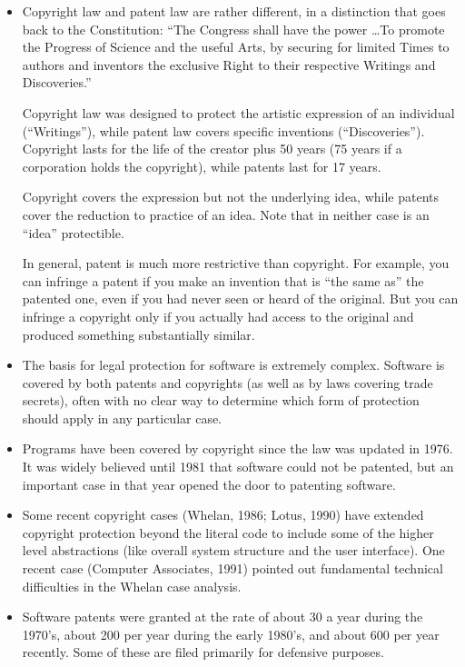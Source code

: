 \begin{itemize}

\item
Copyright law and patent law are rather different, in a distinction that goes
back to the Constitution: ``The Congress shall have the power \ldots To
promote the Progress of Science and the useful Arts, by securing for limited
Times to authors and inventors the exclusive Right to their respective
Writings and Discoveries.''

Copyright law was designed to protect the artistic expression of an
individual (``Writings''), while patent law covers specific inventions
(``Discoveries'').  Copyright lasts for the life of the creator plus
50 years (75 years if a corporation holds the copyright), while
patents last for 17 years.

Copyright covers the expression but not the underlying idea, while
patents cover the reduction to practice of an idea.  Note that in
neither case is an ``idea'' protectible.

In general, patent is much more restrictive than copyright.  For
example, you can infringe a patent if you make an invention that is
``the same as'' the patented one, even if you had never seen or heard
of the original.  But you can infringe a copyright only if you
actually had access to the original and produced something
substantially similar.

\item
The basis for legal protection for software is extremely complex.
Software is covered by both patents and copyrights (as well as by laws
covering trade secrets), often with no clear way to determine which
form of protection should apply in any particular case.

\item	Programs have been covered by copyright since the law was updated in
1976.  It was widely believed until 1981 that software could not be
patented, but an important case in that year opened the door to
patenting software.

\item	Some recent copyright cases (Whelan, 1986; Lotus, 1990) have extended
copyright protection beyond the literal code to include some of the
higher level abstractions (like overall system structure and the user
interface).  One recent case (Computer Associates, 1991) pointed out
fundamental technical difficulties in the Whelan case analysis.

\item	Software patents were granted at the rate of about 30 a year during
the 1970's, about 200 per year during the early 1980's, and about 600
per year recently.  Some of these are filed primarily for defensive
purposes.


\end{itemize}
